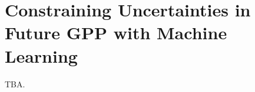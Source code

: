 


\chapter{Constraining Uncertainties in Future \acl{GPP} with Machine Learning}
\label{ch:06:paper_gpp}

TBA.